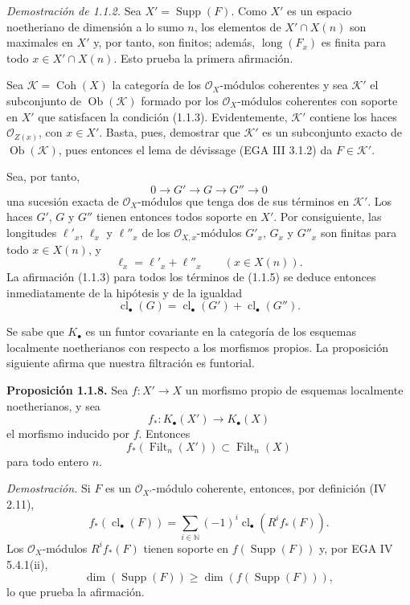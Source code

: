 \documentclass[11pt]{article}
\providecommand{\Filt}{\operatorname{Filt}}
\providecommand{\Coh}{\operatorname{Coh}}
\providecommand{\Supp}{\operatorname{Supp}}
\providecommand{\longg}{\operatorname{long}}
\providecommand{\cl}{\operatorname{cl}}
\begin{document}
\emph{Demostración de 1.1.2.}
Sea $X'=\Supp(F)$. Como $X'$ es un espacio noetheriano de dimensión a lo sumo
$n$, los elementos de $X'\cap X(n)$ son maximales en $X'$ y, por tanto, son
finitos; además, $\longg(F_x)$ es finita para todo $x\in X'\cap X(n)$. Esto
prueba la primera afirmación.

Sea $\mathcal K=\Coh(X)$ la categoría de los $\mathcal O_X$-módulos coherentes
y sea $\mathcal K'$ el subconjunto de $\operatorname{Ob}(\mathcal K)$ formado
por los $\mathcal O_X$-módulos coherentes con soporte en $X'$ que satisfacen
la condición (1.1.3). Evidentemente, $\mathcal K'$ contiene los haces
$\mathcal O_{Z(x)}$, con $x\in X'$. Basta, pues, demostrar que $\mathcal K'$ es
un subconjunto exacto de $\operatorname{Ob}(\mathcal K)$, pues entonces el
lema de dévissage (EGA III 3.1.2) da $F\in\mathcal K'$.

Sea, por tanto,
\begin{equation}\tag{1.1.5}
0\longrightarrow G'\longrightarrow G\longrightarrow G''\longrightarrow0
\end{equation}
una sucesión exacta de $\mathcal O_X$-módulos que tenga dos de sus términos en
$\mathcal K'$. Los haces $G'$, $G$ y $G''$ tienen entonces todos soporte en
$X'$. Por consiguiente, las longitudes $\ell'_x$, $\ell_x$ y $\ell''_x$ de los
$\mathcal O_{X,x}$-módulos $G'_x$, $G_x$ y $G''_x$ son finitas para todo
$x\in X(n)$, y
\begin{equation}\tag{1.1.6}
\ell_x=\ell'_x+\ell''_x\qquad(x\in X(n)).
\end{equation}
La afirmación (1.1.3) para todos los términos de (1.1.5) se deduce entonces
inmediatamente de la hipótesis y de la igualdad
\begin{equation}\tag{1.1.7}
\cl_\bullet(G)=\cl_\bullet(G')+\cl_\bullet(G'').
\end{equation}

Se sabe que $K_\bullet$ es un funtor covariante en la categoría de los esquemas
localmente noetherianos con respecto a los morfismos propios. La proposición
siguiente afirma que nuestra filtración es funtorial.

\textbf{Proposición 1.1.8.}
Sea $f:X'\to X$ un morfismo propio de esquemas localmente noetherianos, y sea
\[
f_*:K_\bullet(X')\longrightarrow K_\bullet(X)
\]
el morfismo inducido por $f$. Entonces
\begin{equation}\tag{1.1.9}
f_*(\Filt_n(X'))\subset\Filt_n(X)
\end{equation}
para todo entero $n$.

\emph{Demostración.}
Si $F$ es un $\mathcal O_{X'}$-módulo coherente, entonces, por definición
(IV 2.11),
\[
f_*(\cl_\bullet(F))=
\sum_{i\in\mathbb N}(-1)^i\cl_\bullet(R^if_*(F)).
\]
Los $\mathcal O_X$-módulos $R^if_*(F)$ tienen soporte en $f(\Supp(F))$ y, por
EGA IV 5.4.1(ii),
\[
\dim(\Supp(F))\geq\dim(f(\Supp(F))),
\]
lo que prueba la afirmación.
\end{document}
